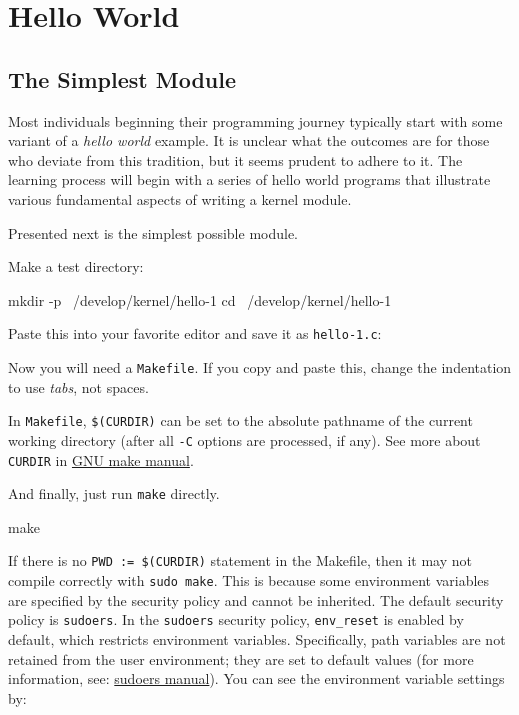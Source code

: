 \documentclass[10pt, oneside]{book}
\begin{document}
\section{Hello World}
\label{sec:helloworld}
\subsection{The Simplest Module}
\label{sec:org2d3e245}
Most individuals beginning their programming journey typically start with some variant of a \emph{hello world} example.
It is unclear what the outcomes are for those who deviate from this tradition, but it seems prudent to adhere to it.
The learning process will begin with a series of hello world programs that illustrate various fundamental aspects of writing a kernel module.

Presented next is the simplest possible module.

Make a test directory:
\begin{codebash}
mkdir -p ~/develop/kernel/hello-1
cd ~/develop/kernel/hello-1
\end{codebash}

Paste this into your favorite editor and save it as \verb|hello-1.c|:


Now you will need a \verb|Makefile|. If you copy and paste this, change the indentation to use \textit{tabs}, not spaces.


In \verb|Makefile|, \verb|$(CURDIR)| can be set to the absolute pathname of the current working directory (after all \verb|-C| options are processed, if any).
See more about \verb|CURDIR| in \href{https://www.gnu.org/software/make/manual/make.html}{GNU make manual}.

And finally, just run \verb|make| directly.

\begin{codebash}
make
\end{codebash}

If there is no \verb|PWD := $(CURDIR)| statement in the Makefile, then it may not compile correctly with \verb|sudo make|.
This is because some environment variables are specified by the security policy and cannot be inherited.
The default security policy is \verb|sudoers|.
In the \verb|sudoers| security policy, \verb|env_reset| is enabled by default, which restricts environment variables.
Specifically, path variables are not retained from the user environment;
they are set to default values (for more information, see: \href{https://www.sudo.ws/docs/man/sudoers.man/}{sudoers manual}).
You can see the environment variable settings by:
\end{document}
